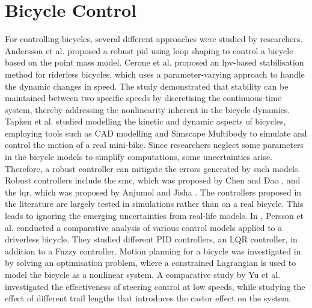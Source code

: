 \section{Bicycle Control}
For controlling bicycles, several different approaches were studied by researchers.
Andersson et al. \cite{andersson2019} proposed a robust \gls{pid} using loop shaping to control a bicycle based on the point mass model.
Cerone et al. \cite{cerone2010StabilizationOA} proposed an \gls{lpv}-based stabilisation method for riderless bicycles, which uses a parameter-varying approach to handle the dynamic changes in speed. The study demonstrated that stability can be maintained between two specific speeds by discretising the continuous-time system, thereby addressing the nonlinearity inherent in the bicycle dynamics.
Tapken et al. \cite{tapken2018modelling} studied modelling the kinetic and dynamic aspects of bicycles, employing tools such as CAD modelling and Simscape Multibody to simulate and control the motion of a real mini-bike.
Since researchers neglect some parameters in the bicycle models to simplify computations, some uncertainties arise. Therefore, a robust controller can mitigate the errors generated by such models. Robust controllers include the \gls{smc}, which was proposed by Chen and Dao \cite{chen2010}, and the \gls{lqr}, which was proposed by Anjumol and Jisha \cite{anjumol2014}. The controllers proposed in the literature are largely tested in simulations rather than on a real bicycle. This leads to ignoring the emerging uncertainties from real-life models.
%
In \cite{persson2021comparative}, Persson et al. conducted a comparative analysis of various control models applied to a driverless bicycle. They studied different PID controllers, an LQR controller, in addition to a Fuzzy controller.
%
Motion planning for a bicycle was investigated in \cite{turnwald2019} by solving an optimisation problem, where a constrained Lagrangian is used to model the bicycle as a nonlinear system.
A comparative study by Yu et al. \cite{yu2018} investigated the effectiveness of steering control at low speeds, while studying the effect of different trail lengths that introduces the castor effect on the system.


